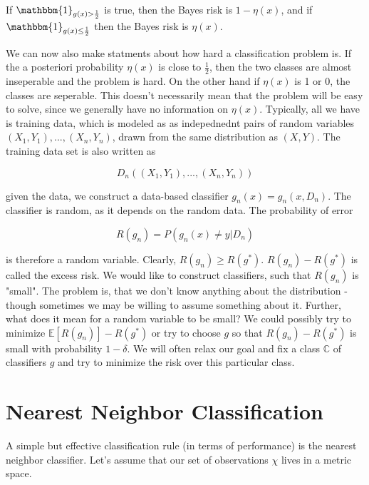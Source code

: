 \documentclass[12pt, authoryear]{elsarticle}
\begin{document}
If $\mathbbm{1}_{g(x)>\frac{1}{2}} $ is true, then the Bayes risk is $1-\eta(x)$, and if $\mathbbm{1}_{g(x)\leq \frac{1}{2}}$ then the Bayes risk is $\eta(x)$.

We can now also make statments about how hard a classification problem is. If the a posteriori probability $\eta(x)$ is close to $\frac{1}{2}$, then the two classes are almost inseperable and the problem is hard. On the other hand if $\eta(x)$ is 1 or 0, the classes are seperable. This doesn't necessarily mean that the problem will be easy to solve, since we generally have no information on $\eta(x)$. Typically, all we have is training data, which is modeled as as indepednednt pairs of random variables $(X_1,Y_1), ... , (X_n,Y_n)$, drawn from the same distribution as $(X,Y)$. The training data set is also written as 

$$D_n( (X_1,Y_1), ... , (X_n,Y_n))$$

given the data, we construct a data-based classifier $g_n(x) = g_n(x,D_n)$. The classifier is random, as it depends on the random data. The probability of error 

$$R(g_n) = P \left(g_n(x) \neq y | D_n \right)$$

is therefore a random variable. Clearly, $R(g_n) \geq R(g^*)$. $R(g_n) - R(g^*)$ is called the excess risk. We would like to construct classifiers, such that $R(g_n)$ is "small". The problem is, that we don't know anything about the distribution - though sometimes we may be willing to assume something about it. Further, what does it mean for a random variable to be small? We could possibly try to minimize $\mathbb{E} \left[ R(g_n)  \right] - R(g^*)$ or try to choose $g$ so that $R(g_n) - R(g^*)$ is small with probability $1-\delta$. We will often relax our goal and fix a class $\mathbb{C}$ of classifiers $g$ and try to minimize the risk over this particular class. 

\section{Nearest Neighbor Classification}

A simple but effective classification rule (in terms of performance) is the nearest neighbor classifier. Let's assume that our set of observations $\chi$ lives in a metric space. 
\end{document}
